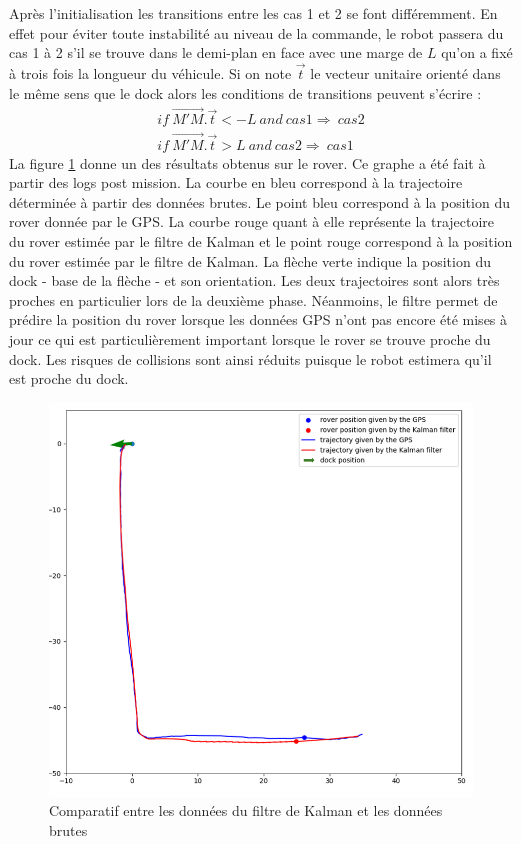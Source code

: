 \documentclass[12pt]{report}
\begin{document}
Après l'initialisation les transitions entre les cas 1 et 2 se font différemment. En effet pour éviter toute instabilité au niveau de la commande, le robot passera du cas 1 à 2 s'il se trouve dans le demi-plan en face avec une marge de $L$ qu'on a fixé à trois fois la longueur du véhicule. Si on note $\overrightarrow{t}$ le vecteur unitaire orienté dans le même sens que le dock alors les conditions de transitions peuvent s'écrire : 
\begin{eqnarray}
    if \ \overrightarrow{M'M} . \overrightarrow{t}<-L \ and \ cas 1 \Rightarrow  \ cas 2 \\ 
    if \ \overrightarrow{M'M} . \overrightarrow{t}>L \ and \ cas 2 \Rightarrow  \ cas 1
\end{eqnarray}
La figure \ref{fig:KalmanvsGPS} donne un des résultats obtenus sur le rover. Ce graphe a été fait à partir des logs post mission. La courbe en bleu correspond à la trajectoire déterminée à partir des données brutes. Le point bleu correspond à la position du rover donnée par le GPS. La courbe rouge quant à elle représente la trajectoire du rover estimée par le filtre de Kalman et le point rouge correspond à la position du rover estimée par le filtre de Kalman. La flèche verte indique la position du dock - base de la flèche - et son orientation. Les deux trajectoires sont alors très proches en particulier lors de la deuxième phase. Néanmoins, le filtre permet de prédire la position du rover lorsque les données GPS n'ont pas encore été mises à jour ce qui est particulièrement important lorsque le rover se trouve proche du dock. Les risques de collisions sont ainsi réduits puisque le robot estimera qu'il est proche du dock. 
\begin{figure}
  \centering
  \includegraphics[width=.8\textwidth]{imgs/GPSvsKalman.png}
  \caption{Comparatif entre les données du filtre de Kalman et les données brutes}
  \label{fig:KalmanvsGPS}
\end{figure}
\end{document}

